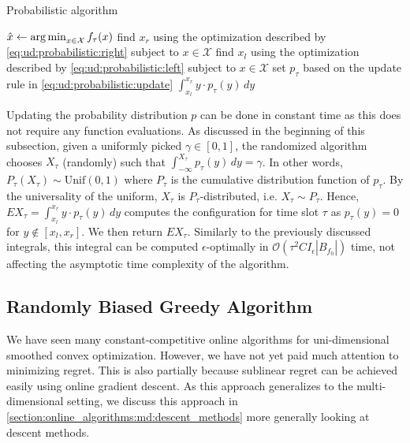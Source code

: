 \begin{algorithm}
    \caption{Probabilistic algorithm~\cite{Bansal2015}}\label{alg:ud:probabilistic}
    $\hat{x} \gets \operatorname*{arg\,min}_{x \in \mathcal{X}} f_{\tau}(x)$\;
    find $x_r$ using the optimization described by \cref{eq:ud:probabilistic:right} subject to $x \in \mathcal{X}$\;
    find $x_l$ using the optimization described by \cref{eq:ud:probabilistic:left} subject to $x \in \mathcal{X}$\;
    set $p_{\tau}$ based on the update rule in \cref{eq:ud:probabilistic:update}\;
    \Return $\int_{x_l}^{x_r} y \cdot p_{\tau}(y) \,dy$\;
\end{algorithm}

Updating the probability distribution $p$ can be done in constant time as this does not require any function evaluations. As discussed in the beginning of this subsection, given a uniformly picked $\gamma \in [0,1]$, the randomized algorithm chooses $X_{\tau}$ (randomly) such that $\int_{-\infty}^{X_{\tau}} p_{\tau}(y) \,dy = \gamma$. In other words, $P_{\tau}(X_{\tau}) \sim \text{Unif}(0,1)$ where $P_{\tau}$ is the cumulative distribution function of $p_{\tau}$. By the universality of the uniform, $X_{\tau}$ is $P_{\tau}$-distributed, i.e. $X_{\tau} \sim P_{\tau}$. Hence, $E X_{\tau} = \int_{x_l}^{x_r} y \cdot p_{\tau}(y) \,dy$ computes the configuration for time slot $\tau$ as $p_{\tau}(y) = 0$ for $y \not\in [x_l, x_r]$. We then return $E X_{\tau}$. Similarly to the previously discussed integrals, this integral can be computed $\epsilon$-optimally in $\mathcal{O}(\tau^2 C I_{\epsilon} |B_{f_0}|)$ time, not affecting the asymptotic time complexity of the algorithm.

\subsection{Randomly Biased Greedy Algorithm}\label{section:online_algorithms:ud:rbg}

We have seen many constant-competitive online algorithms for uni-dimensional smoothed convex optimization. However, we have not yet paid much attention to minimizing regret. This is also partially because sublinear regret can be achieved easily using online gradient descent. As this approach generalizes to the multi-dimensional setting, we discuss this approach in \cref{section:online_algorithms:md:descent_methods} more generally looking at descent methods.

